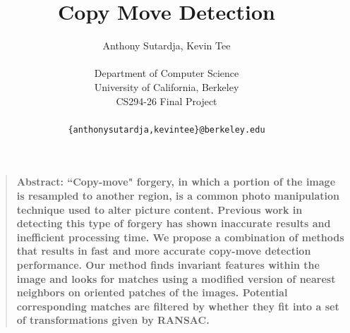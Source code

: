 \documentclass[12pt]{article}
\title{Copy Move Detection}
\author
{Anthony Sutardja, Kevin Tee\\
\\
\normalsize{Department of Computer Science}\\
\normalsize{University of California, Berkeley}\\
\normalsize{CS294-26 Final Project}\\
\\
\normalsize\texttt{\{anthonysutardja,kevintee\}@berkeley.edu} 
}
\date{}
\newenvironment{sciabstract}{%
\begin{quote} \bf}
{\end{quote}}
\begin{document}
 


\baselineskip24pt
\setlength{\parskip}{1em}
\setlength{\parindent}{0em}

\maketitle 




\begin{sciabstract}
Abstract: ``Copy-move" forgery, in which a portion of the image is resampled to another region, is a common photo manipulation technique used to alter picture content. Previous work in detecting this type of forgery has shown inaccurate results and inefficient processing time. We propose a combination of methods that results in fast and more accurate copy-move detection performance. Our method finds invariant features within the image and looks for matches using a modified version of nearest neighbors on oriented patches of the images. Potential corresponding matches are filtered by whether they fit into a set of transformations given by RANSAC.
\end{sciabstract}

\end{document}
